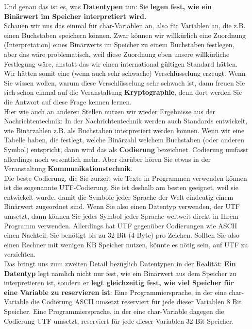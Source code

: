 Und genau das ist es, was \textbf{Datentypen} tun: Sie \textbf{legen fest, wie ein Binärwert im Speicher interpretiert wird.}\\

Schauen wir uns das einmal für char-Variablen an, also für Variablen an, die z.B. einen Buchstaben speichern können. Zwar können wir willkürlich eine Zuordnung (Interpretation) eines Binärwerts im Speicher zu einem Buchstaben festlegen, aber das wäre problematisch, weil diese Zuordnung eben unsere willkürliche Festlegung wäre, anstatt das wir einen international gültigen Standard hätten. Wir hätten somit eine (wenn auch sehr schwache) Verschlüsselung erzeugt. Wenn Sie wissen wollen, warum diese Verschlüsselung sehr schwach ist, dann freuen Sie sich schon einmal auf die Veranstaltung \textbf{Kryptographie}, denn dort werden Sie die Antwort auf diese Frage kennen lernen.\\

Hier wie auch an anderen Stellen nutzen wir wieder Ergebnisse aus der Nachrichtentechnik: In der Nachrichtentechnik werden auch Standards entwickelt, wie Binärzahlen z.B. als Buchstaben interpretiert werden können. Wenn wir eine Tabelle haben, die festlegt, welche Binärzahl welchem Buchstaben (oder anderen Symbol) entspricht, dann wird das als \textbf{Codierung} bezeichnet. Codierung umfasst allerdings noch wesentlich mehr. Aber darüber hören Sie etwas in der Veranstaltung \textbf{Kommunikationstechnik}.\\

Die beste Codierung, die Sie zurzeit wie Texte in Programmen verwenden können ist die sogenannte UTF-Codierung. Sie ist deshalb am besten geeignet, weil sie entwickelt wurde, damit die Symbole jeder Sprache der Welt eindeutig einem Binärwert zugeordnet sind. Wenn Sie also einen Datentyp verwenden, der UTF umsetzt, dann können Sie jedes Symbol jeder Sprache weltweit direkt in Ihrem Programm verwenden. Allerdings hat UTF gegenüber Codierungen wie ASCII einen Nachteil: Sie benötigt bis zu 32 Bit (4 Byte) pro Zeichen. Sollten Sie also einen Rechner mit wenigen KB Speicher nutzen, könnte es nötig sein, auf UTF zu verzichten.\\

Das bringt uns zum zweiten Detail bezüglich Datentypen in der Realität: \textbf{Ein Datentyp} legt nämlich nicht nur fest, wie ein Binärwert aus dem Speicher zu interpretieren ist, sondern er \textbf{legt gleichzeitig fest, wie viel Speicher für eine Variable zu reservieren ist}: Eine Programmiersprache, in der eine char-Variable die Codierung ASCII umsetzt reserviert für jede dieser Variablen 8 Bit Speicher. Eine Programmiersprache, in der eine char-Variable dagegen die Codierung UTF umsetzt, reserviert für jede dieser Variablen 32 Bit Speicher.

